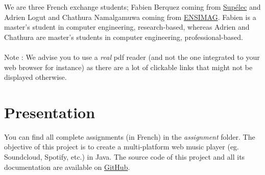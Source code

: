 \documentclass{report}
\begin{document}
We are three French exchange students; Fabien Berquez coming from \href{http://www.supelec.fr/374_p_14603/welcome.html}{Supélec} and Adrien Logut and Chathura Namalgamuwa coming from \href{http://ensimag.grenoble-inp.fr/welcome/}{ENSIMAG}. Fabien is a master's student in computer engineering, research-based, whereas Adrien and Chathura are master's students in computer engineering, professional-based. \\ 

\ \\

Note : We advise you to use a \textit{real} pdf reader (and not the one integrated to your web browser for instance) as there are a lot of clickable links that might not be displayed otherwise.
\chapter{Presentation}

You can find all complete assignments (in French) in the \textit{assignment} folder. The objective of this project is to create a multi-platform web music player (eg. Soundcloud, Spotify, etc.) in Java. The source code of this project and all its documentation are available on \href{https://github.com/cnamal/arch-LOG8430}{GitHub}.


\end{document}
